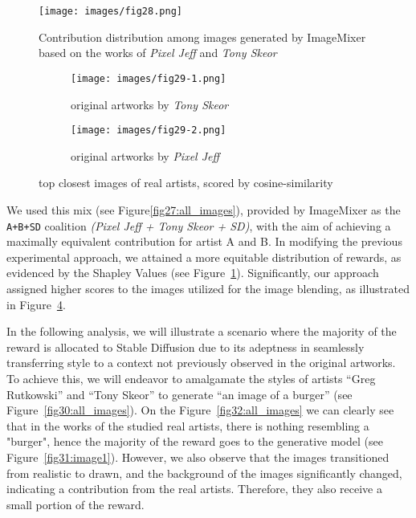 \documentclass[12pt, letterpaper]{article}
\begin{document}
\begin{figure}[h]
    \centering
    \texttt{[image: images/fig28.png]}
    \caption{Contribution distribution among images generated by ImageMixer based on the works of \textit{Pixel Jeff} and \textit{Tony Skeor}}
    \label{fig28:image1}
\end{figure}

\begin{figure}[h]
    \centering
    \begin{subfigure}{0.48\textwidth}
        \centering
        \texttt{[image: images/fig29-1.png]}
        \caption{original artworks by \textit{Tony Skeor}}
        \label{fig29:first_image}
    \end{subfigure}
    \begin{subfigure}{0.48\textwidth}
        \centering
        \texttt{[image: images/fig29-2.png]}
        \caption{original artworks by \textit{Pixel Jeff}}
        \label{fig29:second_image}
    \end{subfigure}
    \caption{top closest images of real artists, scored by cosine-similarity}
    \label{fig29:all_images}    
\end{figure}

We used this mix (see Figure\ref{fig27:all_images}), provided by ImageMixer as the \texttt{A+B+SD} coalition \textit{(Pixel Jeff + Tony Skeor + SD)}, with the aim of achieving a maximally equivalent contribution for artist A and B. In modifying the previous experimental approach, we attained a more equitable distribution of rewards, as evidenced by the Shapley Values (see Figure~\ref{fig28:image1}). Significantly, our approach assigned higher scores to the images utilized for the image blending, as illustrated in Figure~\ref{fig29:all_images}.

In the following analysis, we will illustrate a scenario where the majority of the reward is allocated to Stable Diffusion due to its adeptness in seamlessly transferring style to a context not previously observed in the original artworks. To achieve this, we will endeavor to amalgamate the styles of artists “Greg Rutkowski” and “Tony Skeor” to generate “an image of a burger” (see Figure~\ref{fig30:all_images}). On the Figure~\ref{fig32:all_images} we can clearly see that in the works of the studied real artists, there is nothing resembling a "burger", hence the majority of the reward goes to the generative model (see Figure~\ref{fig31:image1}). However, we also observe that the images transitioned from realistic to drawn, and the background of the images significantly changed, indicating a contribution from the real artists. Therefore, they also receive a small portion of the reward.
\end{document}
